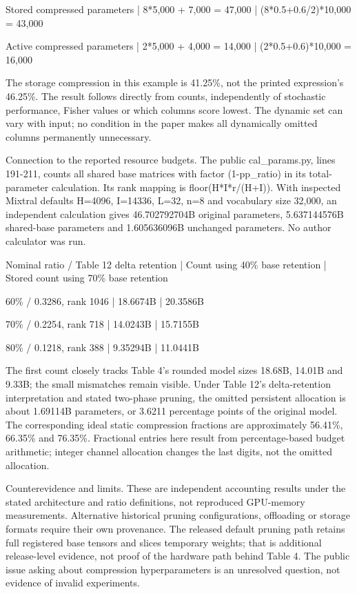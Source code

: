 \documentclass[10pt]{article}
\begin{document}
Stored compressed parameters | 8*5,000 + 7,000 = 47,000 | (8*0.5+0.6/2)*10,000 = 43,000\par
Active compressed parameters | 2*5,000 + 4,000 = 14,000 | (2*0.5+0.6)*10,000 = 16,000\par
The storage compression in this example is 41.25\%, not the printed expression’s 46.25\%. The result follows directly from counts, independently of stochastic performance, Fisher values or which columns score lowest. The dynamic set can vary with input; no condition in the paper makes all dynamically omitted columns permanently unnecessary.\par
Connection to the reported resource budgets. The public cal\_params.py, lines 191-211, counts all shared base matrices with factor (1-pp\_ratio) in its total-parameter calculation. Its rank mapping is floor(H*I*r/(H+I)). With inspected Mixtral defaults H=4096, I=14336, L=32, n=8 and vocabulary size 32,000, an independent calculation gives 46.702792704B original parameters, 5.637144576B shared-base parameters and 1.605636096B unchanged parameters. No author calculator was run.\par
Nominal ratio / Table 12 delta retention | Count using 40\% base retention | Stored count using 70\% base retention\par
60\% / 0.3286, rank 1046 | 18.6674B | 20.3586B\par
70\% / 0.2254, rank 718 | 14.0243B | 15.7155B\par
80\% / 0.1218, rank 388 | 9.35294B | 11.0441B\par
The first count closely tracks Table 4’s rounded model sizes 18.68B, 14.01B and 9.33B; the small mismatches remain visible. Under Table 12’s delta-retention interpretation and stated two-phase pruning, the omitted persistent allocation is about 1.69114B parameters, or 3.6211 percentage points of the original model. The corresponding ideal static compression fractions are approximately 56.41\%, 66.35\% and 76.35\%. Fractional entries here result from percentage-based budget arithmetic; integer channel allocation changes the last digits, not the omitted allocation.\par
Counterevidence and limits. These are independent accounting results under the stated architecture and ratio definitions, not reproduced GPU-memory measurements. Alternative historical pruning configurations, offloading or storage formats require their own provenance. The released default pruning path retains full registered base tensors and slices temporary weights; that is additional release-level evidence, not proof of the hardware path behind Table 4. The public issue asking about compression hyperparameters is an unresolved question, not evidence of invalid experiments.\par
\end{document}
